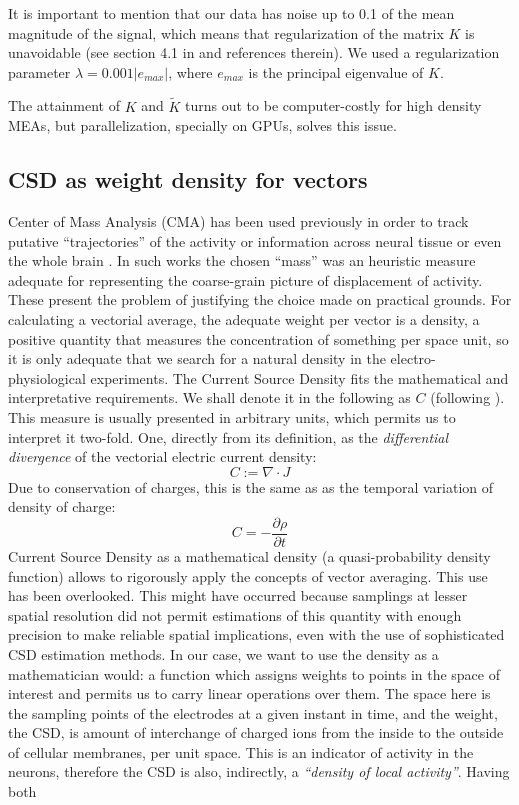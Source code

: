 \documentclass[11pt, letterpaper]{article}
\begin{document}
It is important to mention that our data has noise up to 0.1 of the mean magnitude of the
signal, which means that regularization of the matrix $K$ is unavoidable (see section 4.1 in \cite{Potworowski2011} and references therein). We used a regularization parameter $\lambda=0.001 |e_{max}|$, where $e_{max}$ is the principal eigenvalue of $K$. 

The attainment of $K$ and $\tilde{K}$ turns out to be computer-costly for high density MEAs, but parallelization, specially on GPUs, solves this issue.


\subsection{CSD as weight density for vectors}


Center of Mass Analysis (CMA) has been used previously in order to track putative  ``trajectories'' of the activity or information across neural tissue or even the whole brain \cite{Chao05, Chao07, Manjarrez07, Manjarrez09}. In such works the chosen ``mass'' was an heuristic measure adequate for representing the coarse-grain picture of displacement of activity. These present the problem of justifying the choice made on practical grounds. For calculating a vectorial average, the adequate weight per vector is a density, a positive quantity that measures the concentration of something per space unit, so it is only adequate that we search for a natural density in the electro-physiological experiments. The Current Source Density fits the mathematical and interpretative requirements. We shall denote it in the following as $C$ (following \cite{Potworowski2011}).  This measure is usually presented in arbitrary units, which permits us to interpret it two-fold. One, directly from its definition, as the \emph{differential divergence} of the vectorial electric current density:
\begin{equation}
  C:=\nabla \cdot J
\end{equation}
Due to conservation of charges, this is the same as as the temporal variation of density of charge:
\begin{equation}
  C=-\frac{\partial \rho}{\partial t}
\end{equation}
Current Source Density as a mathematical density (a quasi-probability density function)  allows  to rigorously apply the concepts of vector averaging. This use has been overlooked. This might have occurred because  samplings at lesser spatial resolution did not permit estimations of this quantity with enough precision to make reliable spatial implications, even with the use of sophisticated CSD estimation methods. In our case, we want to use the density as a mathematician would: a function which assigns weights to points in the space of interest and permits us to carry linear operations over them.  The space here is the sampling points of the electrodes at a given instant in time, and the weight, the CSD, is amount of interchange of charged ions from the inside to the outside of cellular membranes, per unit space.  This is an indicator of activity in the neurons, therefore the CSD is also, indirectly, a \emph{``density of local activity''}. Having both
\end{document}
